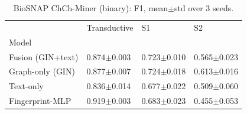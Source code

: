 \begin{table}[t]
\caption{BioSNAP ChCh-Miner (binary): F1, mean$\pm$std over 3 seeds.}
\label{tab:biosnap-f1}
\begin{tabular}{llll}
\toprule
 & Transductive & S1 & S2 \\
Model &  &  &  \\
\midrule
Fusion (GIN+text) & 0.874$\pm$0.003 & 0.723$\pm$0.010 & 0.565$\pm$0.023 \\
Graph-only (GIN) & 0.877$\pm$0.007 & 0.724$\pm$0.018 & 0.613$\pm$0.016 \\
Text-only & 0.836$\pm$0.014 & 0.677$\pm$0.022 & 0.509$\pm$0.060 \\
Fingerprint-MLP & 0.919$\pm$0.003 & 0.683$\pm$0.023 & 0.455$\pm$0.053 \\
\bottomrule
\end{tabular}
\end{table}

